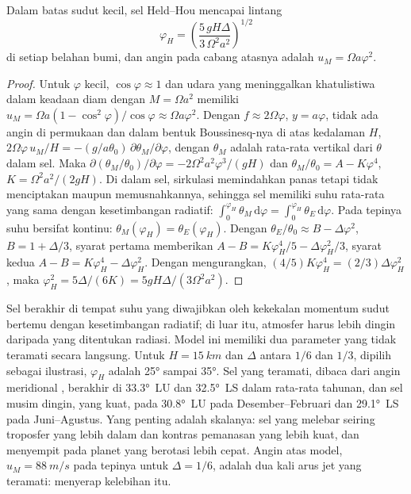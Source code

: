 \begin{theorem}\label{thm:b3:atmospheric-dynamics:held-hou}
Dalam batas sudut kecil, sel Held--Hou mencapai lintang
\[
\varphi_H = \left(\frac{5\,gH\Delta}{3\,\Omega^2a^2}\right)^{1/2}
\]
di setiap belahan bumi, dan angin pada cabang atasnya adalah $u_M = \Omega
a\varphi^2$.
\end{theorem}

\begin{proof}
Untuk $\varphi$ kecil, $\cos\varphi \approx 1$ dan udara yang meninggalkan khatulistiwa dalam
keadaan diam dengan $M = \Omega a^2$ memiliki $u_M = \Omega a(1 - \cos^2\varphi)/\cos\varphi
\approx \Omega a\varphi^2$. Dengan $f \approx 2\Omega\varphi$, $y = a\varphi$,
tidak ada angin di permukaan dan  dalam bentuk Boussinesq-nya di atas
kedalaman $H$, $2\Omega\varphi\,u_M/H = -(g/a\theta_0)\,\partial\theta_M/
\partial\varphi$, dengan $\theta_M$ adalah rata-rata vertikal dari $\theta$ dalam
sel. Maka $\partial(\theta_M/\theta_0)/\partial\varphi = -2\Omega^2a^2
\varphi^3/(gH)$ dan $\theta_M/\theta_0 = A - K\varphi^4$, $K = \Omega^2a^2/
(2gH)$. Di dalam sel, sirkulasi memindahkan panas tetapi tidak menciptakan maupun
memusnahkannya, sehingga sel memiliki suhu rata-rata yang sama dengan
kesetimbangan radiatif: $\int_0^{\varphi_H}\theta_M\,\mathrm d\varphi = \int_0^{\varphi_H}
\theta_E\,\mathrm d\varphi$. Pada tepinya suhu bersifat kontinu:
$\theta_M(\varphi_H) = \theta_E(\varphi_H)$. Dengan $\theta_E/\theta_0 \approx
B - \Delta\varphi^2$, $B = 1 + \Delta/3$, syarat pertama memberikan $A - B =
K\varphi_H^4/5 - \Delta\varphi_H^2/3$, syarat kedua $A - B = K\varphi_H^4 -
\Delta\varphi_H^2$. Dengan mengurangkan, $(4/5)K\varphi_H^4 = (2/3)\Delta
\varphi_H^2$, maka $\varphi_H^2 = 5\Delta/(6K) = 5gH\Delta/(3\Omega^2a^2)$.
\end{proof}

Sel berakhir di tempat suhu yang diwajibkan oleh kekekalan momentum sudut
bertemu dengan kesetimbangan radiatif; di luar itu, atmosfer harus
lebih dingin daripada yang ditentukan radiasi. Model ini memiliki dua parameter yang
tidak teramati secara langsung. Untuk $H = \qty{15}{km}$ dan $\Delta$ antara $1/6$ dan
$1/3$, dipilih sebagai ilustrasi, $\varphi_H$ adalah \ang{25} sampai \ang{35}. Sel
yang teramati, dibaca dari angin meridional , berakhir di
\ang{33.3}~LU dan \ang{32.5}~LS dalam rata-rata tahunan, dan sel musim dingin,
yang kuat, pada \ang{30.8}~LU pada Desember--Februari dan \ang{29.1}~LS pada
Juni--Agustus. Yang penting adalah skalanya: sel yang melebar seiring
troposfer yang lebih dalam dan kontras pemanasan yang lebih kuat, dan menyempit pada
planet yang berotasi lebih cepat. Angin atas model, $u_M =
\qty{88}{m/s}$ pada tepinya untuk $\Delta = 1/6$, adalah dua kali arus jet yang teramati:
 menyerap kelebihan itu.

